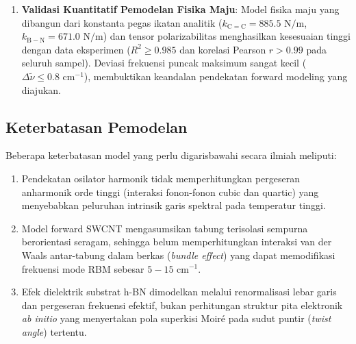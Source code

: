 \begin{enumerate}
\begin{itemize}
        \item Grafena terdefek memperlihatkan pita $D$ ($1348.0\text{ cm}^{-1}$) dan $D'$ ($1621.5\text{ cm}^{-1}$) dengan $I_D/I_G = 0.90$, berkorespondensi dengan kerapatan defek titik $n_D \approx 2.02 \times 10^{11}\text{ cm}^{-2}$.
        \item SWCNT metalik membuktikan keberadaan kopling fonon-plasmon melalui profil asimetris Breit--Wigner--Fano (BWF) pada pita $G^-$ dengan parameter asimetri $1/q = -0.22$.
        \item Heterostruktur grafena/h-BN menunjukkan pemisahan tegas antara mode fonon substrat h-BN $E_{2g}$ ($1366.8\text{ cm}^{-1}$) dari pita defek grafena, serta penyempitan luar biasa FWHM pita $2D$ grafena menjadi $17.5\text{ cm}^{-1}$ akibat supresi fluktuasi muatan lokal substrat.
    \end{itemize}
    \item \textbf{Validasi Kuantitatif Pemodelan Fisika Maju}: Model fisika maju yang dibangun dari konstanta pegas ikatan analitik ($k_{\mathrm{C=C}} = 885.5\text{ N/m}$, $k_{\mathrm{B-N}} = 671.0\text{ N/m}$) dan tensor polarizabilitas menghasilkan kesesuaian tinggi dengan data eksperimen ($R^2 \ge 0.985$ dan korelasi Pearson $r > 0.99$ pada seluruh sampel). Deviasi frekuensi puncak maksimum sangat kecil ($\Delta\tilde{\nu} \le 0.8\text{ cm}^{-1}$), membuktikan keandalan pendekatan forward modeling yang diajukan.
\end{enumerate}

\subsection{Keterbatasan Pemodelan}
Beberapa keterbatasan model yang perlu digarisbawahi secara ilmiah meliputi:
\begin{enumerate}
    \item Pendekatan osilator harmonik tidak memperhitungkan pergeseran anharmonik orde tinggi (interaksi fonon-fonon cubic dan quartic) yang menyebabkan peluruhan intrinsik garis spektral pada temperatur tinggi.
    \item Model forward SWCNT mengasumsikan tabung terisolasi sempurna berorientasi seragam, sehingga belum memperhitungkan interaksi van der Waals antar-tabung dalam berkas (\textit{bundle effect}) yang dapat memodifikasi frekuensi mode RBM sebesar $5 - 15\text{ cm}^{-1}$.
    \item Efek dielektrik substrat h-BN dimodelkan melalui renormalisasi lebar garis dan pergeseran frekuensi efektif, bukan perhitungan struktur pita elektronik \textit{ab initio} yang menyertakan pola superkisi Moiré pada sudut puntir (\textit{twist angle}) tertentu.
\end{enumerate}


